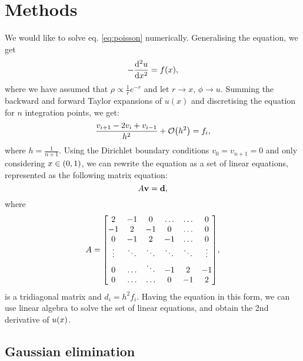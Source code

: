 \section{Methods}
\label{sec:methods}

We would like to solve eq. \ref{eq:poisson} numerically. Generalising the
equation, we get
  \begin{equation} \label{eq:gendiff}
    -\dv[2]{u}{x} = f\qty(x),
  \end{equation}
where we have assumed that $\rho \propto \frac{1}{r}e^{-r}$ and let $ r
\rightarrow x$, $\phi \rightarrow u$.
Summing the backward and forward Taylor expansions of $u(x)$ and discretising
the equation for $n$ integration points, we get:
  \begin{equation}
  \label{eq:approx}
    \frac{v_{i+1} - 2v_i + v_{i-1}}{h^2} + \order{h^2} = f_i,
  \end{equation}
where $h = \frac{1}{n+1}$. Using the Dirichlet boundary conditions
$v_0 = v_{n+1} = 0$ and only considering $x\in\qty(0, 1)$, we can rewrite the
equation as a set of linear equations, represented as the following matrix
equation:
  \begin{equation}
  \label{eq:matrixeq}
    A\vb{v} = \vb{d},
  \end{equation}
where
  \[A =
    \mqty[2 & -1 & 0 & \hdots & \hdots & 0 \\
          -1 & 2 & -1 & 0 & \hdots & 0 \\
          0 & -1 & 2 & -1 & \hdots & 0 \\
          \vdots & \ddots & \ddots & \ddots & \ddots & \vdots \\
          0 & \hdots & \ddots & -1 & 2 & -1 \\
          0 & \hdots & \hdots & 0 & -1 & 2],
  \]
is a tridiagonal matrix and $d_i = h^2f_i$.
Having the equation in this form, we can use linear algebra to solve the set of
linear equations, and obtain the 2nd derivative of $u\qty(x)$.


\subsection{Gaussian elimination}
\label{sec:gaussian}

